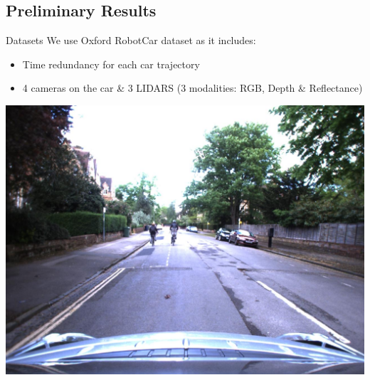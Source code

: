 \subsection{Preliminary Results}

\label{sec:results}

\begin{frame}{Datasets}	
	We use Oxford RobotCar dataset \cite{Maddern2016} as it includes:
	\begin{itemize}
		\item Time redundancy for each car trajectory
		\item 4 cameras on the car \& 3 LIDARS (3 modalities: RGB, Depth \& Reflectance)
	\end{itemize}
	\vfill
	\begin{minipage}[c]{0.22\linewidth}
		\includegraphics[width=\linewidth]{images/robotcar_1.jpg}
		

\end{minipage}
\end{frame}
